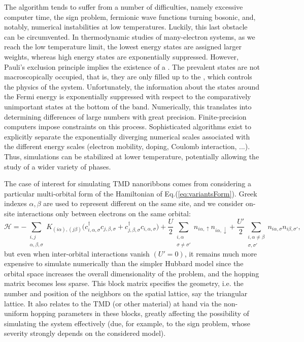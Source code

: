 The algorithm tends to suffer from a number of difficulties, namely excessive computer time, the sign problem, fermionic wave functions turning bosonic, and, notably,  numerical instabilities at low temperatures.
Luckily, this last obstacle can be circumvented.
In thermodynamic studies of many-electron systems, as we reach the low temperature limit, the lowest energy states are assigned larger weights, whereas high energy states are exponentially suppressed.
However, Pauli's exclusion principle implies the existence of a .
The prevalent states are not macroscopically occupied, that is, they are only filled up to the , which controls the physics of the system.
Unfortunately, the information about the states around the Fermi energy is exponentially suppressed with respect to the comparatively unimportant states at the bottom of the band.
Numerically, this translates into determining differences of large numbers with great precision.
Finite-precision computers impose constraints on this process.
Sophisticated algorithms exist to explicitly separate the exponentially diverging numerical scales associated with the different energy scales (electron mobility, doping, Coulomb interaction, ...).
Thus, simulations can be stabilized at lower temperature, potentially allowing the study of a wider variety of phases.

The case of interest for simulating \acs{TMD} nanoribbons comes from considering a particular multi-orbital form of the Hamiltonian of Eq.(\ref{eq:variantsForm}).
Greek indexes $\alpha, \beta$ are used to represent different  on the same site, and we consider on-site  interactions only between electrons on the same orbital:
\begin{equation}\label{eq:variantTMD}
\mathcal{H} = - \sum_{\substack{i, j \\ \alpha, \beta, \sigma}} K_{(i\alpha),(j\beta )} \bigg( c_{i,\alpha, \sigma}^\dagger c_{j,\beta, \sigma} + c_{j,\beta , \sigma}^\dagger c_{i,\alpha, \sigma} \bigg) + \frac{U}{2} \sum_{\substack{i, \alpha \\ \sigma \neq \sigma'} } n_{i\alpha, \uparrow} n_{i\alpha, \downarrow} + \frac{U'}{2} \sum_{\substack{i, \alpha \neq \beta \\ \sigma, \sigma'}} n_{i\alpha, \sigma} n_{i\beta, \sigma'} ,
\end{equation}
but even when inter-orbital interactions vanish $(U' = 0)$, it remains much more expensive to simulate numerically than the simpler Hubbard model since the orbital space increases the overall dimensionality of the problem, and the hopping matrix becomes less sparse.
This block matrix specifies the geometry, i.e. the number and position of the neighbors on the spatial lattice, say the triangular lattice.
It also relates to the \acs{TMD} (or other material) at hand via the non-uniform hopping parameters in these blocks, greatly affecting the possibility of simulating the system effectively (due, for example, to the sign problem, whose severity strongly depends on the considered model).